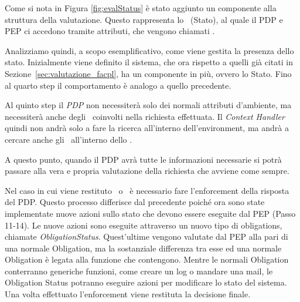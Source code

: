 Come si nota in Figura \ref{fig:evalStatus} è stato aggiunto un componente alla struttura della valutazione.
Questo rappresenta lo \status \ (Stato), al quale il \ac{PDP} e \ac{PEP} ci accedono tramite attributi, che vengono chiamati \statusattribute. \par
Analizziamo quindi, a scopo esemplificativo, come viene gestita la presenza dello stato. Inizialmente viene definito il sistema, che ora rispetto a quelli già citati in Sezione~\ref{sec:valutazione_facpl}, ha un componente in più, ovvero lo Stato.
Fino al quarto step il comportamento è analogo a quello precedente. \par
Al quinto step il \textit{PDP} non necessiterà solo dei normali attributi d'ambiente, ma necessiterà anche degli \statusattribute \ coinvolti nella richiesta effettuata. Il \textit{Context Handler} quindi non andrà solo a fare la ricerca all'interno dell'environment, ma andrà a cercare anche gli \statusattribute \ all'interno dello \status. \par
A questo punto, quando il \ac{PDP} avrà tutte le informazioni necessarie si potrà passare alla vera e propria valutazione della richiesta che avviene come sempre. \par
Nel caso in cui viene restituto \permit \ o \deny \ è necessario fare l'enforcement della risposta del \ac{PDP}. Questo processo differisce dal precedente poiché ora sono state implementate nuove azioni sullo stato che devono essere eseguite dal \ac{PEP} (Passo 11-14). Le nuove azioni sono eseguite attraverso un nuovo tipo di obligations, chiamate \textit{ObligationStatus}. 
Quest'ultime vengono valutate dal \ac{PEP} alla pari di una normale Obligation, ma la sostanziale differenza tra esse ed una normale Obligation è legata alla funzione che contengono. Mentre le normali Obligation conterranno generiche funzioni, come creare un log o mandare una mail, le Obligation Status potranno eseguire azioni per modificare lo stato del sistema.
Una volta effettuato l'enforcement viene restituta la decisione finale.




